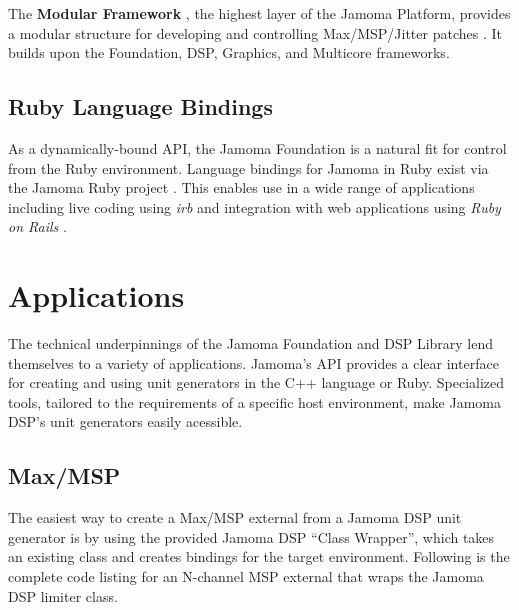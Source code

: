 \documentclass[twoside,10pt]{article}
\begin{document}
The \textbf{Modular Framework} \cite{web13}, the highest layer of the Jamoma Platform, provides a modular structure for developing  and controlling Max/MSP/Jitter patches \cite{Place:2006}. It builds upon the Foundation, DSP, Graphics, and Multicore frameworks.



\subsection{Ruby Language Bindings} %

As a dynamically-bound API, the Jamoma Foundation is a natural fit for control from the Ruby environment.  Language bindings for Jamoma in Ruby exist via the Jamoma Ruby project \cite{web14}.  This enables use in a wide range of applications including live coding using \emph{irb} \cite{web15} and integration with web applications using \emph{Ruby on Rails} \cite{web16}.




\section{Applications} %


The technical underpinnings of the Jamoma Foundation and DSP Library lend themselves to a variety of applications. 
Jamoma's API provides a clear interface for creating and using unit generators in the C++ language or Ruby.  Specialized tools, tailored to the requirements of a specific host environment, make Jamoma DSP's unit generators easily acessible.


\subsection{Max/MSP} \label{sec:classwrapper}
The easiest way to create a Max/MSP external from a Jamoma DSP unit generator is by using the provided Jamoma DSP ``Class Wrapper'', which takes an existing class and creates bindings for the target environment. Following is the complete code listing for an N-channel MSP external that wraps the Jamoma DSP limiter class.
\end{document}
